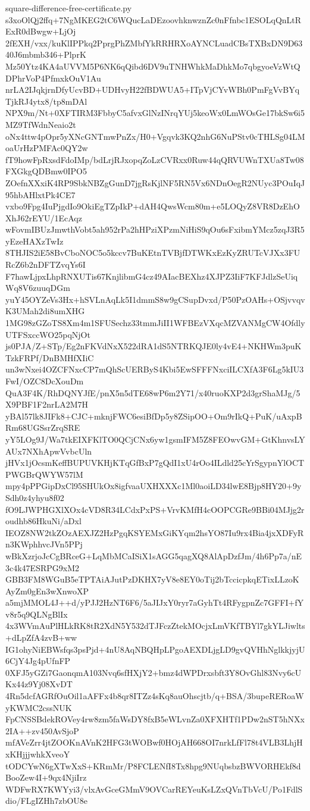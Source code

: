 \documentclass[11pt]{article}
\theoremstyle{definition}
\theoremstyle{remark}
\begin{document}
\begin{filecontents*}[overwrite]{square-difference-free-certificate.py}
s3xoOlQj2ffq+7NgMKEG2tC6WQucLaDEzoovhknwznZc0nFfnbc1ESOLqQnLtRExR0dBwgw+LjOj
2fEXH/vxx/kuKlIPPkq2PprgPhZMbfYkRRHRXoAYNCLuadCBsTXBxDN9D6340J6mbmb346+PlprK
Mz50Ytz4KA4aUVVM5P6NK6qQibd6DV9uTNHWhkMaDhkMo7qbgyoeVzWtQDPhrVoP4PfmxkOuV1Au
nrLA2IJqkjrnDfyUcvBD+UDHvyH22fBDWUA5+ITpVjCYvWBh0PmFgVvBYqTjkRJ4ytx8/tp8mDAl
NPX9m/Nt+0XFTIRM3FbbyC5afvxGlNzINrqYUj5keoWx0LmWOsGe17bkSw6i5MZ9TfWdnNeaio2t
oNx4ttw4pOpr5yXNcGNTmwPnZx/H0+Vgqvk3KQ2nhG6NuPStv0cTHLSg04LMoaUrHzPMFAc0QY2w
fT9howFpRxsdFdoIMp/bdLrjRJxopqZoLzCVRxx0Ruw44qQRVUWnTXUa8Tw08FXGkgQDBmw0IPO5
ZOefnXXxiK4RP9SbkNBZgGunD7jgRsKjlNF5RN5Vx6NDnOegR2NUyc3POuIqJ95hbAHlxtPk4CE7
vxbo9Fpg4IuPjgdIo9OkiEgTZpIkP+dAH4QwsWcm80m+e5LOQyZ8VR8DzEhOXhJ62rEYU/1EcAqz
wFovmIBUzJmwthVobt5ah952rPa2hHPziXPzmNiHiS9qOu6sFxibmYMcz5zqJ3R5yEzeHAXzTwIz
8THJIS2iE58BvCboNOC5o5kccv7BuKEtnTVBjfDTWKxEzKyZRUTcVJXx3FURcZ6b2nDFTZvqYs6I
F7hawLjpxLhpRNXUTis67KnjlibmG4cz49AIacBEXhz4XJPZ3IiF7KFJdlzSeUiqWq8V6zuuqDGm
yuY45OYZeVs3Hx+hSVLnAqLk5I1dmmS8w9gCSupDvxd/P50PzOAHs+OSjvvqvK3UMah2di8umXHG
1MG98zGZoTS8Xm4m1SFUSechz33tmmJiII1WFBEzVXqcMZVANMgCW4OfdlyUTFSxccWO25pqNjOt
js0PJA/Z+STp/Eg2nFKVdNxX522dRA1dS5NTRKQJE0ly4vE4+NKHWm3puKTzkFRPf/DnBMHfXIiC
un3wNxei4OZCFNxcCP7mQhScUERByS4Kbi5EwSFFFNxciILCXfA3F6Lg5kIU3FwI/OZC8DcXouDm
QuA3F4K/RhDQNYJfE/pnX5n5dTE68wP6m2Y71/x40ruoKXP2d3grShaMJg/5X9PBF1F2nrLA2M7H
yBAl57lk8JIFk8+CJC+mknjFWC6esiBfDp5y8ZSipOO+Om9rIkQ+PuK/uAxpBRm68UGSsrZrqSRE
yY5LOg9J/Wa7tkEIXFKlTO0QCjCNx6yw1gsmIFM5Z8FEOwvGM+GtKhnvsLYAUx7NXhApwVvbcUln
jHVx1jOcsmKeffBUPUVKHjKTqGfBxP7gQdI1xU4rOo4ILdld25cYrSgypnYlOCTPWGBrQWYW57lM
mpy4pPPGipDxCl95SHUkOx8igfvaaUXHXXXc1Ml0aoiLD34lwE8Bjp8HY20+9ySdh0z4yhyu8f02
fO9LJWPHGXlXOx4cVD8R34LCdxPxPS+VrvKMfH4cOOPCGRe9BBi04MJjg2roudhb86HkuNi/aDxl
IEOZ8NW2tkZOzAEXJZ2HzPgqKSYEMxGiKYqm2hsYO87Iu9rx4Bia4jxXDFyRn3KWphhvcJVn5PPj
wBkXzrjoJcCgBRceG+LqMbMCaISiX1sAGG5qagXQ8AlApDzfJm/4h6Pp7a/nE3c4k47ESRPG9xM2
GBB3FM8WGuB5eTPTAiAJutPzDKHX7yV8e8EY0oTij2bTccicpkqETixLLzoKAyZm0gEn3wXnwoXP
a5mjMMOL4J++d/yPJJ2HzNT6F6/5aJIJxY0ryr7aGyhTt4RFygpnZc7GFFI+fYv8r5q9QLNgBlIx
4x3WVmAuPlHLkRK8tR2XdN5Y532dTJFczZtekMOcjxLmVKfTBYl7gkYLJiwlts+dLpZfA4zvB+ww
IG1ohyNiEBWsfqs3psPjd+4nU8AqNBQHpLPgoAEXDLjgLD9gvQVHhNglkkjyjU6CjY4Jg4pUfnFP
0XFJ5yGZi7GaonqmA103Nvq6sfHXjY2+bmz4dWPDrxsbft3Y8OvGhl83Nvy6cUKx44z9Yj08XvDT
4Rn5dcfAGRfOuOil1aAFFx4b8qr8ITZz4sKq8auOhscjtb/q+BSA/3bupeRERoaWyKWMC2cssNUK
FpCNSSBdekROVey4rw8zm5faWsDY8fxB5eWLvnZa0XFXHTf1PDw2nST5hNXx2IA++zv450AvSjoP
mfAVeZrr4jtZOOKnAVnK2HFG3tWOBwf0HOjAH668OI7nrkLfFl78t4VLB3LhjHxKHjjjwhkXveoY
tODCYwN6gXTwXxS+KRmMr/P8FCLENfI8Tx8hpg9NUqbsbzBWVORHEkf8dBooZew4I+9qx4NjiIrz
WDFwRX7KWYyi3/vlxAvGceGMmV9OVCarREYeuKsLZxQVnTbVcU/Po1FdlSdio/FLgIZHh7zbOU8e

\end{filecontents*}
\end{document}
